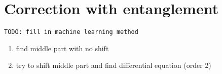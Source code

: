 \section{Correction with entanglement}

\texttt{TODO: fill in machine learning method}

\begin{enumerate}
	\item find middle part with no shift
	\item try to shift middle part and find differential equation (order 2)
\end{enumerate}
 